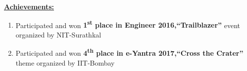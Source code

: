 \documentclass[10pt]{article}
\begin{document}
	\underline{\textbf{\Large{Achievements:}}}
	\begin{enumerate}
		\item{Participated and won \textbf{1\textsuperscript{st}
				place in Engineer 2016,“Trailblazer”} event organized
			by NIT-Surathkal}
		\item{Participated and won \textbf{4\textsuperscript{th}
				place in e-Yantra 2017,“Cross the Crater”} theme
			organized by IIT-Bombay}	
	\end{enumerate}
\end{document}
